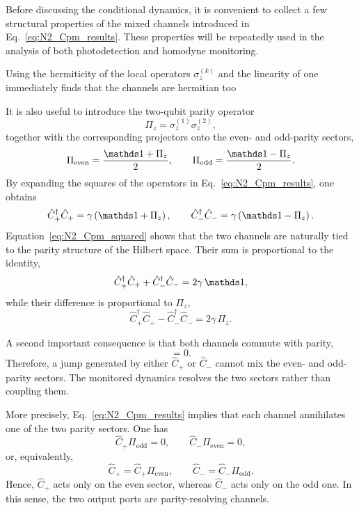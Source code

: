 Before discussing the conditional dynamics, it is convenient to collect a few structural properties of the mixed channels introduced in Eq.~\eqref{eq:N2_Cpm_results}. These properties will be repeatedly used in the analysis of both photodetection and homodyne monitoring.

Using the hermiticity of the local operators \(\sigma_z^{(k)}\) and the linearity of one immediately finds that the channels are hermitian too

It is also useful to introduce the two-qubit parity operator
\begin{equation}
	\Pi_z=\sigma_z^{(1)}\sigma_z^{(2)},
	\label{eq:N2_parity_operator}
\end{equation}
together with the corresponding projectors onto the even- and odd-parity sectors,
\begin{equation}
	\Pi_{\mathrm{even}}=\frac{\id+\Pi_z}{2},
	\qquad
	\Pi_{\mathrm{odd}}=\frac{\id-\Pi_z}{2}.
	\label{eq:N2_parity_projectors}
\end{equation}
By expanding the squares of the operators in Eq.~\eqref{eq:N2_Cpm_results}, one obtains
\begin{equation}
	\hat C_+^\dagger \hat C_+
	=
	\gamma\left(\id+\Pi_z\right),
	\qquad
	\hat C_-^\dagger \hat C_-
	=
	\gamma\left(\id-\Pi_z\right).
	\label{eq:N2_Cpm_squared}
\end{equation}
Equation~\eqref{eq:N2_Cpm_squared} shows that the two channels are naturally tied to the parity structure of the Hilbert space. Their sum is proportional to the identity,
\begin{equation}
	\hat C_+^\dagger \hat C_+
	+
	\hat C_-^\dagger \hat C_-
	=
	2\gamma\,\id,
	\label{eq:N2_Cpm_sum_identity}
\end{equation}
while their difference is proportional to \(\Pi_z\),
\begin{equation}
	\hat C_+^\dagger \hat C_+
	-
	\hat C_-^\dagger \hat C_-
	=
	2\gamma\,\Pi_z.
	\label{eq:N2_Cpm_difference_parity}
\end{equation}

A second important consequence is that both channels commute with parity,
\begin{equation}
	[\hat C_\pm,\Pi_z]=0.
	\label{eq:N2_Cpm_commute_parity}
\end{equation}
Therefore, a jump generated by either \(\hat C_+\) or \(\hat C_-\) cannot mix the even- and odd-parity sectors. The monitored dynamics resolves the two sectors rather than coupling them.

More precisely, Eq.~\eqref{eq:N2_Cpm_results} implies that each channel annihilates one of the two parity sectors. One has
\begin{equation}
	\hat C_+\Pi_{\mathrm{odd}}=0,
	\qquad
	\hat C_-\Pi_{\mathrm{even}}=0,
	\label{eq:N2_Cpm_dark_sectors}
\end{equation}
or, equivalently,
\begin{equation}
	\hat C_+=\hat C_+\Pi_{\mathrm{even}},
	\qquad
	\hat C_-=\hat C_-\Pi_{\mathrm{odd}}.
	\label{eq:N2_Cpm_supported_sectors}
\end{equation}
Hence, \(\hat C_+\) acts only on the even sector, whereas \(\hat C_-\) acts only on the odd one. In this sense, the two output ports are parity-resolving channels.

